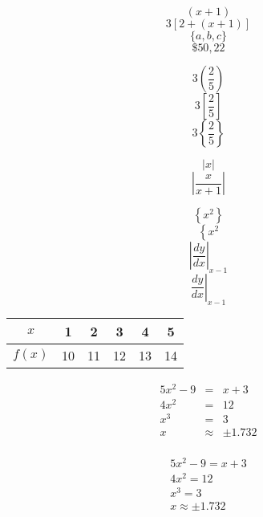 \documentclass[10pt]{article}
\begin{document}
$$(x+1)$$
$$3[2+(x+1)]$$
$$\{a,b,c\}$$
$$\$50,22$$

$$3\left(\frac{2}{5}\right)$$
$$3\left[\frac{2}{5}\right]$$
$$3\left\{\frac{2}{5}\right\}$$

$$|x|$$
$$\left|\frac{x}{x+1}\right|$$

$$\left\{x^2\right\}$$
$$\left\{x^2\right.$$
$$\left|\frac{dy}{dx}\right|_{x-1}$$
$$\left.\frac{dy}{dx}\right|_{x-1}$$


\begin{tabular}{|c|c|c|c|c|c|} \hline

$x$ &1 &2 &3 &4 &5 \\ \hline
$f(x)$ &10 &11 &12 &13 &14  \\ \hline

\end{tabular}


\begin{eqnarray*}
5x^2-9&=&x+3 \\
4x^2&=&12  \\
x^3&=&3 \\
x&\approx&\pm1.732 \\
\end{eqnarray*}


\begin{eqnarray}
5x^2-9=x+3 \\
4x^2=12  \\
x^3=3 \\
x\approx\pm1.732
\end{eqnarray}
\end{document}

